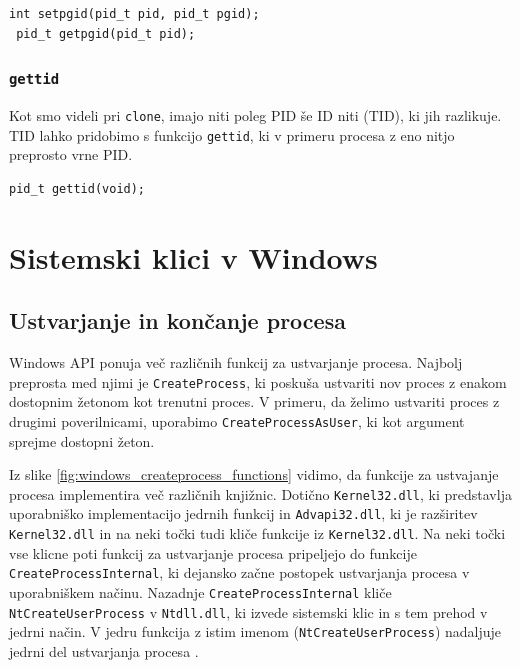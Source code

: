 \documentclass[a4paper,12pt,openright]{book}
\begin{document}
\begin{lstlisting}[style=func]
 int setpgid(pid_t pid, pid_t pgid);
 pid_t getpgid(pid_t pid);
\end{lstlisting}

\subsubsection{\texttt{gettid}}

Kot smo videli pri \texttt{clone}, imajo niti poleg PID še ID niti (TID), ki jih razlikuje.
TID lahko pridobimo s funkcijo \texttt{gettid}, ki v primeru procesa z eno nitjo preprosto vrne PID.

\begin{lstlisting}[style=func]
 pid_t gettid(void);
\end{lstlisting}

\section{Sistemski klici v Windows}

\subsection{Ustvarjanje in končanje procesa}

Windows API ponuja več različnih funkcij za ustvarjanje procesa.
Najbolj preprosta med njimi je \texttt{CreateProcess}, ki poskuša ustvariti nov proces z enakom dostopnim žetonom kot trenutni proces.
V primeru, da želimo ustvariti proces z drugimi poverilnicami, uporabimo \texttt{CreateProcessAsUser}, ki kot argument sprejme dostopni žeton.

Iz slike \ref{fig:windows_createprocess_functions} vidimo, da funkcije za ustvajanje procesa implementira več različnih knjižnic.
Dotično \texttt{Kernel32.dll}, ki predstavlja uporabniško implementacijo jedrnih funkcij in \texttt{Advapi32.dll}, ki je razširitev \texttt{Kernel32.dll} in na neki točki tudi kliče funkcije iz \texttt{Kernel32.dll}.
Na neki točki vse klicne poti funkcij za ustvarjanje procesa pripeljejo do funkcije \texttt{CreateProcessInternal}, ki dejansko začne postopek ustvarjanja procesa v uporabniškem načinu.
Nazadnje \texttt{CreateProcessInternal} kliče \texttt{NtCreateUserProcess} v \texttt{Ntdll.dll}, ki izvede sistemski klic in s tem prehod v jedrni način.
V jedru funkcija z istim imenom (\texttt{NtCreateUserProcess}) nadaljuje jedrni del ustvarjanja procesa \cite{Yosifovich_Russinovich_Solomon_Ionescu_2017}.
\end{document}
